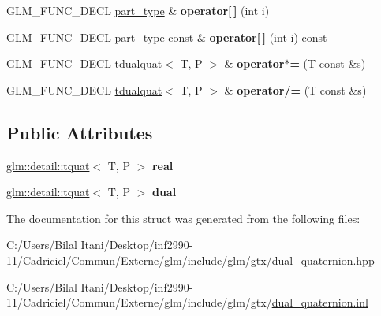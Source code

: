 \begin{DoxyCompactItemize}
\item 
G\+L\+M\+\_\+\+F\+U\+N\+C\+\_\+\+D\+E\+CL \hyperlink{structglm_1_1detail_1_1tquat}{part\+\_\+type} \& {\bfseries operator\mbox{[}$\,$\mbox{]}} (int i)\hypertarget{structglm_1_1detail_1_1tdualquat_a6c97baca66efdfefa2e127d4868ce22c}{}\label{structglm_1_1detail_1_1tdualquat_a6c97baca66efdfefa2e127d4868ce22c}

\item 
G\+L\+M\+\_\+\+F\+U\+N\+C\+\_\+\+D\+E\+CL \hyperlink{structglm_1_1detail_1_1tquat}{part\+\_\+type} const \& {\bfseries operator\mbox{[}$\,$\mbox{]}} (int i) const \hypertarget{structglm_1_1detail_1_1tdualquat_a7a646a4f41587c5a8ba9ebb728b64b24}{}\label{structglm_1_1detail_1_1tdualquat_a7a646a4f41587c5a8ba9ebb728b64b24}

\item 
G\+L\+M\+\_\+\+F\+U\+N\+C\+\_\+\+D\+E\+CL \hyperlink{structglm_1_1detail_1_1tdualquat}{tdualquat}$<$ T, P $>$ \& {\bfseries operator$\ast$=} (T const \&s)\hypertarget{structglm_1_1detail_1_1tdualquat_ab958553d52f05997218dc32ff66308ff}{}\label{structglm_1_1detail_1_1tdualquat_ab958553d52f05997218dc32ff66308ff}

\item 
G\+L\+M\+\_\+\+F\+U\+N\+C\+\_\+\+D\+E\+CL \hyperlink{structglm_1_1detail_1_1tdualquat}{tdualquat}$<$ T, P $>$ \& {\bfseries operator/=} (T const \&s)\hypertarget{structglm_1_1detail_1_1tdualquat_a16b0b3f78c28d7cf982761d66dada98d}{}\label{structglm_1_1detail_1_1tdualquat_a16b0b3f78c28d7cf982761d66dada98d}

\end{DoxyCompactItemize}
\subsection*{Public Attributes}
\begin{DoxyCompactItemize}
\item 
\hyperlink{structglm_1_1detail_1_1tquat}{glm\+::detail\+::tquat}$<$ T, P $>$ {\bfseries real}\hypertarget{structglm_1_1detail_1_1tdualquat_abebb177d1dca2b170fe7d01e9970eb37}{}\label{structglm_1_1detail_1_1tdualquat_abebb177d1dca2b170fe7d01e9970eb37}

\item 
\hyperlink{structglm_1_1detail_1_1tquat}{glm\+::detail\+::tquat}$<$ T, P $>$ {\bfseries dual}\hypertarget{structglm_1_1detail_1_1tdualquat_a6d739e4771a6244cc15562c2ecda7fdc}{}\label{structglm_1_1detail_1_1tdualquat_a6d739e4771a6244cc15562c2ecda7fdc}

\end{DoxyCompactItemize}


The documentation for this struct was generated from the following files\+:\begin{DoxyCompactItemize}
\item 
C\+:/\+Users/\+Bilal Itani/\+Desktop/inf2990-\/11/\+Cadriciel/\+Commun/\+Externe/glm/include/glm/gtx/\hyperlink{dual__quaternion_8hpp}{dual\+\_\+quaternion.\+hpp}\item 
C\+:/\+Users/\+Bilal Itani/\+Desktop/inf2990-\/11/\+Cadriciel/\+Commun/\+Externe/glm/include/glm/gtx/\hyperlink{dual__quaternion_8inl}{dual\+\_\+quaternion.\+inl}\end{DoxyCompactItemize}
